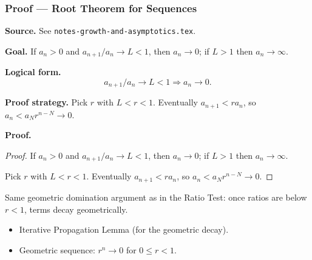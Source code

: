 
\clearpage
{}
\hypertarget{proof-RA-ABB-T-root-thm-seq}{}

\subsubsection[Root Theorem for Sequences]{Proof --- Root Theorem for Sequences}

\bigskip

\noindent
\textbf{Source.} See \texttt{notes-growth-and-asymptotics.tex}.

\vspace{0.75em}

\noindent
\textbf{Goal.} If $a_n > 0$ and $a_{n+1}/a_n \to L < 1$, then $a_n \to 0$; if $L > 1$ then $a_n \to \infty$.

\vspace{0.75em}

\noindent
\textbf{Logical form.}
\[
  a_{n+1}/a_n \to L < 1 \Rightarrow a_n \to 0.
\]

\vspace{0.75em}

\noindent
\textbf{Proof strategy.} Pick $r$ with $L < r < 1$. Eventually $a_{n+1} < r a_n$, so $a_n < a_N r^{n-N} \to 0$.

\vspace{0.75em}

\noindent
\textbf{Proof.}
\begin{proof}
\Claim If $a_n > 0$ and $a_{n+1}/a_n \to L < 1$, then $a_n \to 0$; if $L > 1$ then $a_n \to \infty$.

\Given 

\Goal 

\Strategy Pick $r$ with $L < r < 1$. Eventually $a_{n+1} < r a_n$, so $a_n < a_N r^{n-N} \to 0$.

\medskip


\end{proof}

\begin{remark*}
Same geometric domination argument as in the Ratio Test: once ratios are below $r < 1$, terms decay geometrically.
\end{remark*}

\begin{remark*}[Dependencies]
\begin{itemize}
  \item Iterative Propagation Lemma (for the geometric decay).
  \item Geometric sequence: $r^n \to 0$ for $0 \le r < 1$.
\end{itemize}
\end{remark*}
